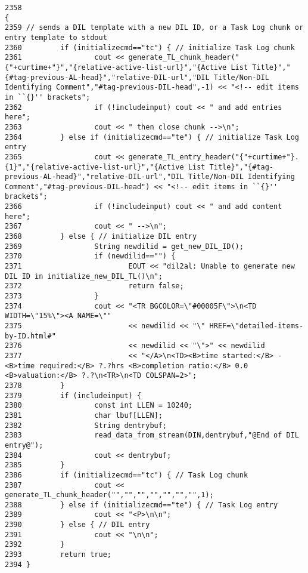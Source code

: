 \footnotesize\begin{verbatim}2358                                                                     {
2359 // sends a DIL template with a new DIL ID, or a Task Log chunk or entry template to stdout
2360         if (initializecmd=="tc") { // initialize Task Log chunk
2361                 cout << generate_TL_chunk_header("{"+curtime+"}","{relative-active-list-url}","{Active List Title}","{#tag-previous-AL-head}","relative-DIL-url","DIL Title/Non-DIL Identifying Comment","#tag-previous-DIL-head",-1) << "<!-- edit items in ``{}'' brackets";
2362                 if (!includeinput) cout << " and add entries here";
2363                 cout << " then close chunk -->\n";
2364         } else if (initializecmd=="te") { // initialize Task Log entry
2365                 cout << generate_TL_entry_header("{"+curtime+"}.{1}","{relative-active-list-url}","{Active List Title}","{#tag-previous-AL-head}","relative-DIL-url","DIL Title/Non-DIL Identifying Comment","#tag-previous-DIL-head") << "<!-- edit items in ``{}'' brackets";
2366                 if (!includeinput) cout << " and add content here";
2367                 cout << " -->\n";
2368         } else { // initialize DIL entry
2369                 String newdilid = get_new_DIL_ID();
2370                 if (newdilid=="") {
2371                         EOUT << "dil2al: Unable to generate new DIL ID in initialize_new_DIL_TL()\n";
2372                         return false;
2373                 }
2374                 cout << "<TR BGCOLOR=\"#00005F\">\n<TD WIDTH=\"15%\"><A NAME=\""
2375                         << newdilid << "\" HREF=\"detailed-items-by-ID.html#"
2376                         << newdilid << "\">" << newdilid
2377                         << "</A>\n<TD><B>time started:</B> - <B>time required:</B> ?.?hrs <B>completion ratio:</B> 0.0 <B>valuation:</B> ?.?\n<TR>\n<TD COLSPAN=2>";
2378         }
2379         if (includeinput) {
2380                 const int LLEN = 10240;
2381                 char lbuf[LLEN];
2382                 String dentrybuf;
2383                 read_data_from_stream(DIN,dentrybuf,"@End of DIL entry@");
2384                 cout << dentrybuf;
2385         }
2386         if (initializecmd=="tc") { // Task Log chunk
2387                 cout << generate_TL_chunk_header("","","","","","","",1);
2388         } else if (initializecmd=="te") { // Task Log entry
2389                 cout << "<P>\n\n";
2390         } else { // DIL entry
2391                 cout << "\n\n";
2392         }
2393         return true;
2394 }
\end{verbatim}\normalsize 
{}
